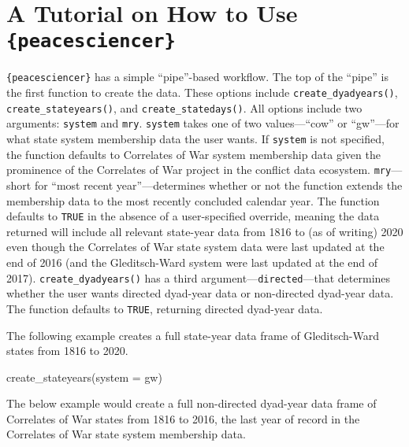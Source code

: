 \documentclass[
  11pt,
]{article}
\newenvironment{Shaded}{\begin{snugshade}}{\end{snugshade}}
\newcommand{\AttributeTok}[1]{\textcolor[rgb]{0.77,0.63,0.00}{#1}}
\newcommand{\FunctionTok}[1]{\textcolor[rgb]{0.00,0.00,0.00}{#1}}
\newcommand{\NormalTok}[1]{#1}
\newcommand{\StringTok}[1]{\textcolor[rgb]{0.31,0.60,0.02}{#1}}
\begin{document}
\hypertarget{a-tutorial-on-how-to-use-peacesciencer}{%
\section{\texorpdfstring{A Tutorial on How to Use \texttt{\{peacesciencer\}}}{A Tutorial on How to Use \{peacesciencer\}}}\label{a-tutorial-on-how-to-use-peacesciencer}}

\texttt{\{peacesciencer\}} has a simple ``pipe''-based workflow. The top of the ``pipe'' is the first function to create the data. These options include \texttt{create\_dyadyears()}, \texttt{create\_stateyears()}, and \texttt{create\_statedays()}. All options include two arguments: \texttt{system} and \texttt{mry}. \texttt{system} takes one of two values---``cow'' or ``gw''---for what state system membership data the user wants. If \texttt{system} is not specified, the function defaults to Correlates of War system membership data given the prominence of the Correlates of War project in the conflict data ecosystem. \texttt{mry}---short for ``most recent year''---determines whether or not the function extends the membership data to the most recently concluded calendar year. The function defaults to \texttt{TRUE} in the absence of a user-specified override, meaning the data returned will include all relevant state-year data from 1816 to (as of writing) 2020 even though the Correlates of War state system data were last updated at the end of 2016 (and the Gleditsch-Ward system were last updated at the end of 2017). \texttt{create\_dyadyears()} has a third argument---\texttt{directed}---that determines whether the user wants directed dyad-year data or non-directed dyad-year data. The function defaults to \texttt{TRUE}, returning directed dyad-year data.

The following example creates a full state-year data frame of Gleditsch-Ward states from 1816 to 2020.

\begin{Shaded}
\begin{Highlighting}[]
\FunctionTok{create\_stateyears}\NormalTok{(}\AttributeTok{system =} \StringTok{\textquotesingle{}gw\textquotesingle{}}\NormalTok{)}
\end{Highlighting}
\end{Shaded}

The below example would create a full non-directed dyad-year data frame of Correlates of War states from 1816 to 2016, the last year of record in the Correlates of War state system membership data.
\end{document}
